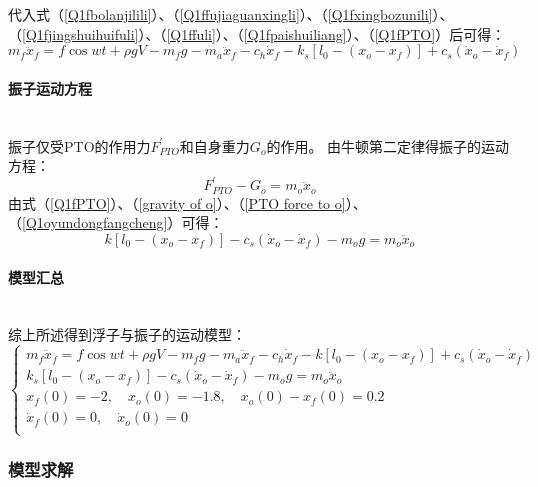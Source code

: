 \documentclass{my_paper}
\newcommand{\subsubsubsection}[1]{\paragraph{#1}\mbox{}\\}
\begin{document}
代入式（\ref{Q1fbolanjilili}）、（\ref{Q1ffujiaguanxingli}）、（\ref{Q1fxingbozunili}）、（\ref{Q1fjingshuihuifuli}）、（\ref{Q1ffuli}）、（\ref{Q1fpaishuiliang}）、（\ref{Q1fPTO}）后可得：
\begin{equation}
    m_f\ddot x_f=f \cos wt+\rho g V-m_f g-m_{a}\ddot x_f-c_h \dot x_f-k_s[l_0-(x_o-x_f)]+c_s(\dot x_o-\dot x_f)
\end{equation}

\subsubsubsection{振子运动方程}

振子仅受PTO的作用力$F_{PTO}^{'}$和自身重力$G_o$的作用。
由牛顿第二定律得振子的运动方程：
\begin{equation}
    F_{PTO}^{'}-G_o=m_o\ddot x_o\label{Q1oyundongfangcheng}
\end{equation}
由式（\ref{Q1fPTO}）、（\ref{gravity of o}）、（\ref{PTO force to o}）、（\ref{Q1oyundongfangcheng}）可得：
\begin{equation}
    k[l_0-(x_o-x_f)]-c_s(\dot x_o -\dot x_f)-m_o g=m_o\ddot x_o
\end{equation}

\subsubsubsection{模型汇总}

综上所述得到浮子与振子的运动模型：
\begin{equation}
    \left\{\begin{matrix} 
        m_f\ddot x_f=f \cos wt+\rho g V-m_f g-m_{a}\ddot x_f-c_h \dot x_{f}-k[l_{0}-(x_{o}-x_{f})]+c_{s}(\dot x_{o}-\dot x_{f}) \\ 
        k_{s}[l_{0}-(x_{o}-x_{f})]-c_{s}(\dot x_{o}-\dot x_{f})-m_{o} g=m_{o}\ddot x_{o} \\  
        x_f(0)=-2, \quad x_{o}(0)=-1.8, \quad x_{o}(0)-x_{f}(0)=0.2\\
        \dot x_f(0)=0, \quad \dot x_o(0)=0\\
  \end{matrix}\right.    \label{bian liang dai huan}
\end{equation}

 \subsubsection{模型求解}
\end{document}
